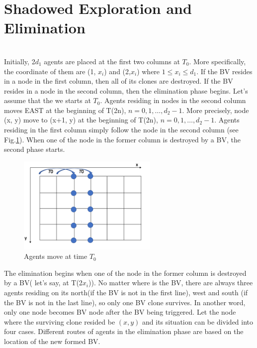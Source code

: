 \section{Shadowed Exploration and Elimination}
 \\
Initially, 2$d_1$ agents are placed at the first two columns at $T_0$. More specifically, the coordinate of them are (1, $x_i$) and (2,$x_i$) where $1\leq x_i\leq d_1$. If the BV resides in a node in the first column, then all of its clones are destroyed. If the BV resides in a node in the second column, then the elimination phase begins. Let's assume that the we starts at $T_0$. Agents residing in nodes in the second column moves EAST at the beginning of T(2n), $n=0,1, \ldots ,d_2-1$. More precisely, node (x, y) move to (x+1, y) at the beginning of T(2n), $n=0,1, \dots , d_2-1$. Agents residing in the first column simply follow the node in the second column (see  Fig.\ref{fig:TShE}). When one of the node in the former column is destroyed by a BV, the second phase starts.
\begin{figure}[H]
  \centering  
  \includegraphics[width=0.6\textwidth]{figures/TShE.png}
  \caption{Agents move at time $T_0$}\label{fig:TShE}
\end{figure}
The elimination begins when one of the node in the former column is destroyed by a BV( let's say, at T(2$x_i$)). No matter where is the BV, there are always three agents residing on its north(if the BV is not in the first line), west and south (if the BV is not in the last line), so only one BV clone survives. In another word, only one node becomes BV node after the BV being triggered. Let the node where the surviving clone resided be $(x, y)$ and its situation can be divided into four cases. Different routes of agents in the elimination phase are based on the location of the new formed BV.

